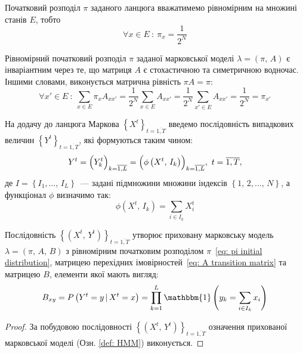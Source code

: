 Початковий розподіл $\pi$ заданого ланцюга вважатимемо рівномірним на множині станів $E$, тобто 
\begin{equation}\label{eq: pi initial distribution}
    \forall x \in E\ :\ \pi_x = \frac{1}{2^N}
\end{equation}

\begin{remark}
    Рівномірний початковий розподіл $\pi$ заданої марковської моделі $\lambda=(\pi,\,A)$ є інваріантним через те, що матриця $A$ є стохастичною та симетричною водночас. Іншими словами, виконується матрична рівність $\pi A=\pi:$
    \begin{equation*}
        \forall x' \in E\ :\ \sum\limits_{x \in E} \pi_x A_{xx'} = \frac{1}{2^N} \sum\limits_{x \in E} A_{xx'} = \frac{1}{2^N} \sum\limits_{x' \in E} A_{xx'} = \frac{1}{2^N} = \pi_{x'}
    \end{equation*}
\end{remark}

На додачу до ланцюга Маркова $\left\{ X^t \right\}_{t=\overline{1,T}}$ введемо послідовність випадкових величин $\left\{ Y^t \right\}_{t=\overline{1,T}}$, які формуються таким чином: 
\begin{equation}\label{eq: Y observations}
    Y^t = \Bigl( Y^t_k \Bigr)_{k=\overline{1,L}} = \Bigl( \phi\left( X^t,\,I_k \right) \Bigr)_{k=\overline{1,L}},\ t=\overline{1,T},
\end{equation}
де $I=\left\{ I_1,\ldots,\,I_L \right\}$~--- задані підмножини множини індексів $\left\{ 1,\,2,\ldots,\,N \right\}$, а функціонал $\phi$ визначимо так:
\begin{equation}\label{eq: phi function}
    \phi\left( X^t,\,I_k \right) = \sum_{i \in I_k} X^t_i
\end{equation}

\begin{claim}
    Послідовність $\left\{ \left( X^t,\,Y^t \right) \right\}_{t=\overline{1,T}}$ утворює приховану марковську модель $\lambda=\left( \pi,\,A,\,B \right)$ з рівномірним початковим розподілом $\pi$~\eqref{eq: pi initial distribution}, матрицею перехідних імовірностей~\eqref{eq: A transition matrix} та матрицею $B$, елементи якої мають вигляд:
    \begin{equation}\label{eq: B emission matrix}
        B_{xy}=P\left( Y^t=y\,|\,X^t=x \right) = \prod\limits_{k=1}^{L} \mathbbm{1}\left( y_k=\sum\limits_{i \in I_k} x_i \right)
    \end{equation}
\end{claim}
\begin{proof}
    За побудовою послідовності $\left\{ \left( X^t,\,Y^t \right) \right\}_{t=\overline{1,T}}$ означення прихованої марковської моделі (Озн. \ref{def: HMM}) виконується. 
\end{proof}

